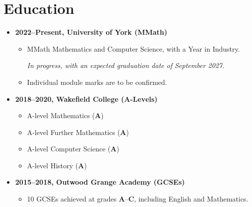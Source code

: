 \documentclass{article}
\newcommand{\todomark}{\color{red}{\textbf{[TODO]}}}
\begin{document}
\section{Education}
\begin{itemize}
        \item \textbf{2022--Present, University of York (MMath)}
        \begin{itemize}
                \item MMath Mathematics and Computer Science, with a Year in
                Industry.

                \textit{In progress, with an expected graduation date of
                September 2027.}

                \item Individual module marks are to be confirmed. \todomark%
        \end{itemize}
        \item \textbf{2018--2020, Wakefield College (A-Levels)}
        \begin{itemize}
                \item A-level Mathematics (\textbf{A})
                \item A-level Further Mathematics (\textbf{A})
                \item A-level Computer Science (\textbf{A})
                \item A-level History (\textbf{A})
        \end{itemize}
        \item \textbf{2015--2018, Outwood Grange Academy (GCSEs)}
        \begin{itemize}
                \item 10 GCSEs achieved at grades \textbf{A}--\textbf{C},
                including English and Mathematics.
        \end{itemize}
\end{itemize}

%
%
\end{document}
